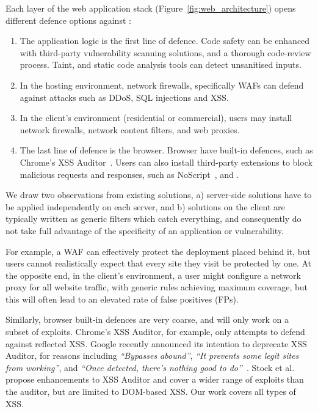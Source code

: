 Each layer of the web application stack  (Figure~\ref{fig:web_architecture}) opens different defence options against \xss:
\begin{enumerate}

\item The application logic is the first line of defence.
  Code safety can be enhanced with third-party vulnerability scanning solutions, and a thorough
  code-review process. Taint, and static code analysis tools can detect unsanitised inputs.

\item In the hosting environment, network firewalls, specifically \acp{WAF} can defend against attacks such as \ac{DDoS}, \ac{SQL} injections and \ac{XSS}.

\item In the client's environment (residential or commercial), users may install network firewalls, network content filters, and web proxies.

\item The last line of defence is the browser.
  Browser have built-in defences, such as
  Chrome's \ac{XSS} Auditor~\cite{xssauditor}. Users can also
  install third-party extensions to block malicious requests and
  responses, such as NoScript~\cite{Noscript}, and \sys.
\end{enumerate}

We draw two observations from existing solutions, a) server-side
solutions have to be applied independently on each server, and b)
solutions on the client are typically written as generic filters which
catch everything, and consequently do not take full advantage
of the specificity of an application or vulnerability.

For example, a \ac{WAF} can effectively protect the deployment placed
behind it, but users cannot realistically expect that every site they
visit be protected by one. At the opposite end, in the client's
environment, a user might configure a network proxy for all website
traffic, with generic rules achieving maximum coverage, but this
will often lead to an elevated rate of false positives (FPs).

Similarly, browser built-in defences are very coarse, and will only
work on a subset of exploits. Chrome's XSS Auditor, for example, only
attempts to defend against reflected \ac{XSS}. Google recently
announced its intention to deprecate XSS Auditor, for reasons
including \emph{``Bypasses abound''}, \emph{``It prevents some legit
  sites from working''}, and \emph{``Once detected, there's nothing
  good to do''}~\cite{deprecatexssauditor}. Stock et
al.~\cite{precise_dom_xss} propose enhancements to XSS Auditor and
cover a wider range of exploits than the auditor, but are limited to
DOM-based \ac{XSS}.  Our work covers all types of \ac{XSS}.

